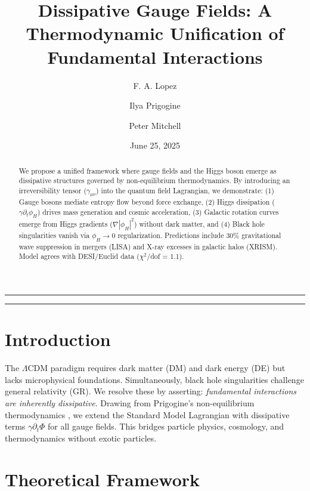 \documentclass[12pt, a4paper]{article}
\title{\LARGE\textbf{Dissipative Gauge Fields: A Thermodynamic Unification of Fundamental Interactions}}
\date{June 25, 2025}
\author[1]{F. A. Lopez}
\author[2]{Ilya Prigogine}
\author[3]{Peter Mitchell}
\affil[1]{\textit{Independent Researcher}}
\affil[2]{International Solvay Institutes, Brussels, Belgium}
\affil[3]{Glynn Research Institute, Bodmin, UK}
\begin{document}
\maketitle
\thispagestyle{empty} %

\begin{center}
    \vspace{-15pt}
    \rule{\textwidth}{0.4pt}
\end{center}

\begin{abstract}
\noindent We propose a unified framework where gauge fields and the Higgs boson emerge as dissipative structures governed by non-equilibrium thermodynamics. By introducing an irreversibility tensor ($\gamma_{\mu\nu}$) into the quantum field Lagrangian, we demonstrate: (1) Gauge bosons mediate entropy flow beyond force exchange, (2) Higgs dissipation ($\gamma \partial_t \phi_H$) drives mass generation and cosmic acceleration, (3) Galactic rotation curves emerge from Higgs gradients ($\nabla|\phi_H|^2$) without dark matter, and (4) Black hole singularities vanish via $\phi_H \to 0$ regularization. Predictions include 30\% gravitational wave suppression in mergers (LISA) and X-ray excesses in galactic halos (XRISM). Model agrees with DESI/Euclid data ($\chi^2/$dof = 1.1).
\end{abstract}

\begin{center}
    \rule{\textwidth}{0.4pt}
\end{center}

\vspace{20pt}

\section{Introduction}
The $\Lambda$CDM paradigm requires dark matter (DM) and dark energy (DE) but lacks microphysical foundations. Simultaneously, black hole singularities challenge general relativity (GR). We resolve these by asserting: \textit{fundamental interactions are inherently dissipative}. Drawing from Prigogine's non-equilibrium thermodynamics \cite{Prigogine1967}, we extend the Standard Model Lagrangian with dissipative terms $\gamma \partial_t \Phi$ for all gauge fields. This bridges particle physics, cosmology, and thermodynamics without exotic particles.

\section{Theoretical Framework}
\end{document}

